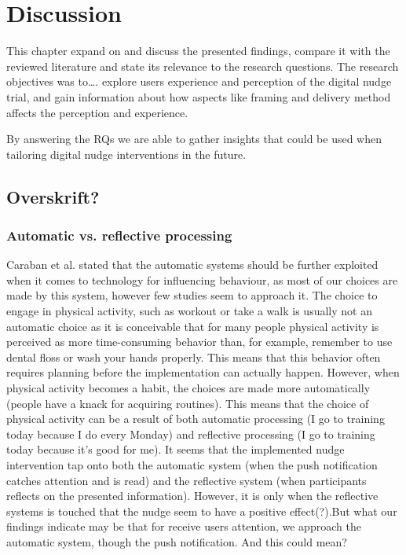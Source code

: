 \chapter{Discussion}
This chapter expand on and discuss the presented findings, compare it with the reviewed literature and state its relevance to the research questions. The research objectives was to…. explore users experience and perception of the digital nudge trial, and gain information about how aspects like framing and delivery method affects the perception and experience. 

By answering the RQs we are able to gather insights that could be used when tailoring digital nudge interventions in the future. 

\section{Overskrift?}

\subsection{Automatic vs. reflective processing}
Caraban et al. \cite{caraban_23_2019} stated that the automatic systems should be further exploited when it comes to technology for influencing behaviour, as most of our choices are made by this system, however few studies seem to approach it. The choice to engage in physical activity, such as workout or take a walk is usually not an automatic choice as it is conceivable that for many people physical activity is perceived as more time-consuming behavior than, for example, remember to use dental floss or wash your hands properly. This means that this behavior often requires planning before the implementation can actually happen. However, when physical activity becomes a habit, the choices are made more automatically (people have a knack for acquiring routines). This means that the choice of physical activity can be a result of both automatic processing (I go to training today because I do every Monday) and reflective processing (I go to training today because it's good for me). It seems that the implemented nudge intervention tap onto both the automatic system (when the push notification catches attention and is read) and the reflective system (when participants reflects on the presented information). However, it is only when the reflective systems is touched that the nudge seem to have a positive effect(?).But what our findings indicate may be that for receive users attention, we approach the automatic system, though the push notification. And this could mean?

